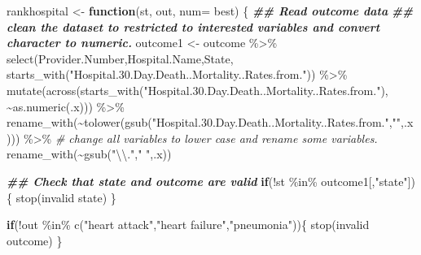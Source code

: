 \documentclass[
]{article}
\newenvironment{Shaded}{\begin{snugshade}}{\end{snugshade}}
\newcommand{\AttributeTok}[1]{\textcolor[rgb]{0.77,0.63,0.00}{#1}}
\newcommand{\CommentTok}[1]{\textcolor[rgb]{0.56,0.35,0.01}{\textit{#1}}}
\newcommand{\ControlFlowTok}[1]{\textcolor[rgb]{0.13,0.29,0.53}{\textbf{#1}}}
\newcommand{\DocumentationTok}[1]{\textcolor[rgb]{0.56,0.35,0.01}{\textbf{\textit{#1}}}}
\newcommand{\FunctionTok}[1]{\textcolor[rgb]{0.00,0.00,0.00}{#1}}
\newcommand{\NormalTok}[1]{#1}
\newcommand{\OtherTok}[1]{\textcolor[rgb]{0.56,0.35,0.01}{#1}}
\newcommand{\SpecialCharTok}[1]{\textcolor[rgb]{0.00,0.00,0.00}{#1}}
\newcommand{\StringTok}[1]{\textcolor[rgb]{0.31,0.60,0.02}{#1}}
\begin{document}
\begin{Shaded}
\begin{Highlighting}[]
\NormalTok{rankhospital }\OtherTok{\textless{}{-}} \ControlFlowTok{function}\NormalTok{(st, out, }\AttributeTok{num=} \StringTok{\textasciigrave{}}\AttributeTok{best\textquotesingle{}}\StringTok{\textasciigrave{}}\NormalTok{) \{}
  \DocumentationTok{\#\# Read outcome data}
  \DocumentationTok{\#\# clean the dataset to restricted to interested variables and convert character to numeric.}
\NormalTok{          outcome1 }\OtherTok{\textless{}{-}}\NormalTok{ outcome }\SpecialCharTok{\%\textgreater{}\%}
            \FunctionTok{select}\NormalTok{(Provider.Number,Hospital.Name,State, }\FunctionTok{starts\_with}\NormalTok{(}\StringTok{"Hospital.30.Day.Death..Mortality..Rates.from."}\NormalTok{)) }\SpecialCharTok{\%\textgreater{}\%}
            \FunctionTok{mutate}\NormalTok{(}\FunctionTok{across}\NormalTok{(}\FunctionTok{starts\_with}\NormalTok{(}\StringTok{"Hospital.30.Day.Death..Mortality..Rates.from."}\NormalTok{), }\SpecialCharTok{\textasciitilde{}}\FunctionTok{as.numeric}\NormalTok{(.x))) }\SpecialCharTok{\%\textgreater{}\%}
            \FunctionTok{rename\_with}\NormalTok{(}\SpecialCharTok{\textasciitilde{}}\FunctionTok{tolower}\NormalTok{(}\FunctionTok{gsub}\NormalTok{(}\StringTok{"Hospital.30.Day.Death..Mortality..Rates.from."}\NormalTok{,}\StringTok{""}\NormalTok{,.x))) }\SpecialCharTok{\%\textgreater{}\%} \CommentTok{\# change all variables to lower case and rename some variables.}
            \FunctionTok{rename\_with}\NormalTok{(}\SpecialCharTok{\textasciitilde{}}\FunctionTok{gsub}\NormalTok{(}\StringTok{"}\SpecialCharTok{\textbackslash{}\textbackslash{}}\StringTok{."}\NormalTok{,}\StringTok{" "}\NormalTok{,.x))}

  \DocumentationTok{\#\# Check that state and outcome are valid}
            \ControlFlowTok{if}\NormalTok{(}\SpecialCharTok{!}\NormalTok{st }\SpecialCharTok{\%in\%}\NormalTok{ outcome1[,}\StringTok{"state"}\NormalTok{])\{}
              \FunctionTok{stop}\NormalTok{(}\StringTok{\textquotesingle{}invalid state\textquotesingle{}}\NormalTok{)}
\NormalTok{            \}}

            \ControlFlowTok{if}\NormalTok{(}\SpecialCharTok{!}\NormalTok{out }\SpecialCharTok{\%in\%} \FunctionTok{c}\NormalTok{(}\StringTok{"heart attack"}\NormalTok{,}\StringTok{"heart failure"}\NormalTok{,}\StringTok{"pneumonia"}\NormalTok{))\{}
              \FunctionTok{stop}\NormalTok{(}\StringTok{\textquotesingle{}invalid outcome\textquotesingle{}}\NormalTok{)}
\NormalTok{            \}}


\end{Highlighting}
\end{Shaded}
\end{document}
